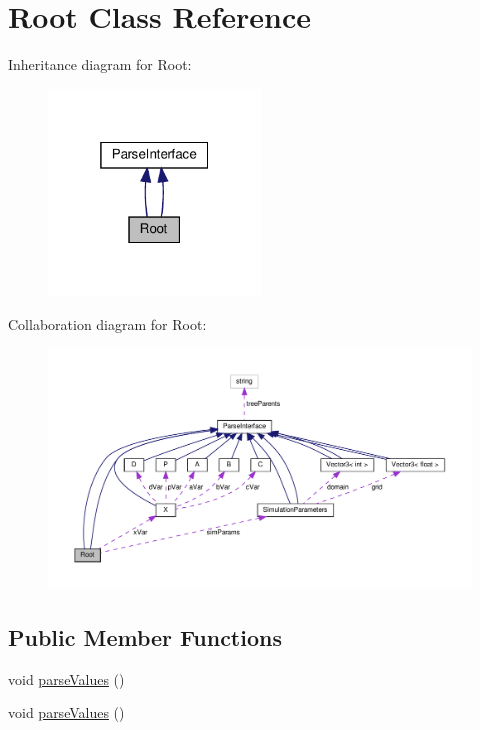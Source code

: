 \hypertarget{classRoot}{}\section{Root Class Reference}
\label{classRoot}


Inheritance diagram for Root\+:
\nopagebreak
\begin{figure}[H]
\begin{center}
\leavevmode
\includegraphics[width=160pt]{classRoot__inherit__graph}
\end{center}
\end{figure}


Collaboration diagram for Root\+:
\nopagebreak
\begin{figure}[H]
\begin{center}
\leavevmode
\includegraphics[width=350pt]{classRoot__coll__graph}
\end{center}
\end{figure}
\subsection*{Public Member Functions}
\begin{DoxyCompactItemize}
\item 
void \hyperlink{classRoot_ade0eb65da55fa8c045a76bcf1fb16009}{parse\+Values} ()
\item 
void \hyperlink{classRoot_ade0eb65da55fa8c045a76bcf1fb16009}{parse\+Values} ()
\end{DoxyCompactItemize}

